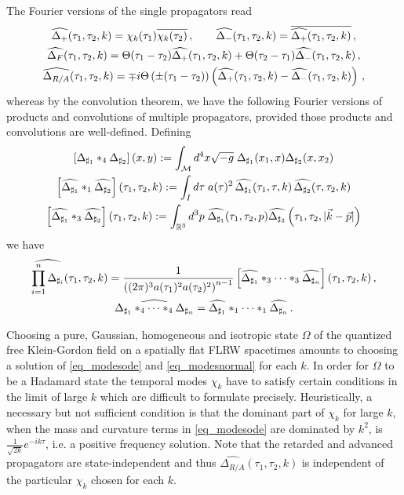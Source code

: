 \documentclass[a4paper,10pt,twoside]{article}
\numberwithin{equation}{section}
\newcounter{and}
\def\bbR{\mathbb{R}}
\def\M{\mathcal{M}}
\theoremstyle{plain}
\theoremstyle{definition}
\begin{document}
The Fourier versions of the single propagators read
\begin{gather}
\widehat{\Delta_+}(\tau_1,\tau_2,k)=\chi_k(\tau_1)\overline{\chi_k(\tau_2)}\,,\qquad \widehat{\Delta_-}(\tau_1,\tau_2,k)= \overline{\widehat{\Delta_+}(\tau_1,\tau_2,k)}\,,\notag\\
\widehat{\Delta_F}(\tau_1,\tau_2,k)=\Theta(\tau_1-\tau_2)\widehat{\Delta_+}(\tau_1,\tau_2,k)+\Theta(\tau_2-\tau_1)\widehat{\Delta_-}(\tau_1,\tau_2,k)\label{eq_propagatorsfourierexp}\,,\\
\widehat{\Delta_{R/A}}(\tau_1,\tau_2,k)=\mp i \Theta\left(\pm(\tau_1-\tau_2)\right)\left(\widehat{\Delta_+}(\tau_1,\tau_2,k)-\widehat{\Delta_-}(\tau_1,\tau_2,k)\right)\,,\notag
\end{gather}
whereas by the convolution theorem, we have the following Fourier versions of products and convolutions of multiple propagators, provided those products and convolutions are well-defined. 
Defining
\begin{gather}
\left[\Delta_{\sharp_1}\ast_4\Delta_{\sharp_2}\right](x,y):=\int_\M d^4x \sqrt{-g}\; \Delta_{\sharp_1}(x_1,x)\Delta_{\sharp_2}(x,x_2)\notag\\
\left[\widehat{\Delta_{\sharp_1}}\ast_1\widehat{\Delta_{\sharp_2}}\right](\tau_1,\tau_2,k):=\int_I d\tau \;a(\tau)^2 \,\widehat{\Delta_{\sharp_1}}(\tau_1,\tau,k)\,\widehat{\Delta_{\sharp_2}}(\tau,\tau_2,k)\label{eq_defconvolutions}\\
\left[\widehat{\Delta_{\sharp_1}}\ast_3\widehat{\Delta_{\sharp_2}}\right](\tau_1,\tau_2,k):=\int_{\bbR^3} d^3p\;\widehat{\Delta_{\sharp_1}}(\tau_1,\tau_2,p)\widehat{\Delta_{\sharp_2}}\left(\tau_1,\tau_2,|\vec{k}-\vec{p}|\right)\notag
\end{gather}
we have
\begin{gather}\label{eq_convolutionidentities}
\widehat{\prod^n_{i=1}\Delta_{\sharp_i}}(\tau_1,\tau_2,k)=\frac{1}{\left((2\pi)^3 a(\tau_1)^{2}a(\tau_2)^{2}\right)^{n-1}}\left[\widehat{\Delta_{\sharp_1}}\ast_3\cdots\ast_3\widehat{\Delta_{\sharp_n}}\right](\tau_1,\tau_2,k)\,,\\
\widehat{\Delta_{\sharp_1}\ast_4\cdots\ast_4\Delta_{\sharp_n}}=\widehat{\Delta_{\sharp_1}}\ast_1\cdots\ast_1
\widehat{\Delta_{\sharp_n}}\,.\notag
\end{gather}

Choosing a pure, Gaussian, homogeneous and isotropic state $\Omega$ of the quantized free Klein-Gordon field on a spatially flat FLRW spacetimes amounts to choosing a solution of \eqref{eq_modesode} and \eqref{eq_modesnormal} for each $k$. In order for $\Omega$ to be a Hadamard state the temporal modes $\chi_k$ have to satisfy certain conditions in the limit of large $k$ which are difficult to formulate precisely. Heuristically, a necessary but not sufficient condition is that the dominant part of $\chi_k$ for large $k$, when the mass and curvature terms in \eqref{eq_modesode} are dominated by $k^2$, is $\frac{1}{\sqrt{2k}}e^{-ik\tau}$, i.e. a positive frequency solution. Note that the retarded and advanced propagators are state-independent and thus $\widehat{\Delta_{R/A}}(\tau_1,\tau_2,k)$ is independent of the particular $\chi_k$ chosen for each $k$.
\end{document}
